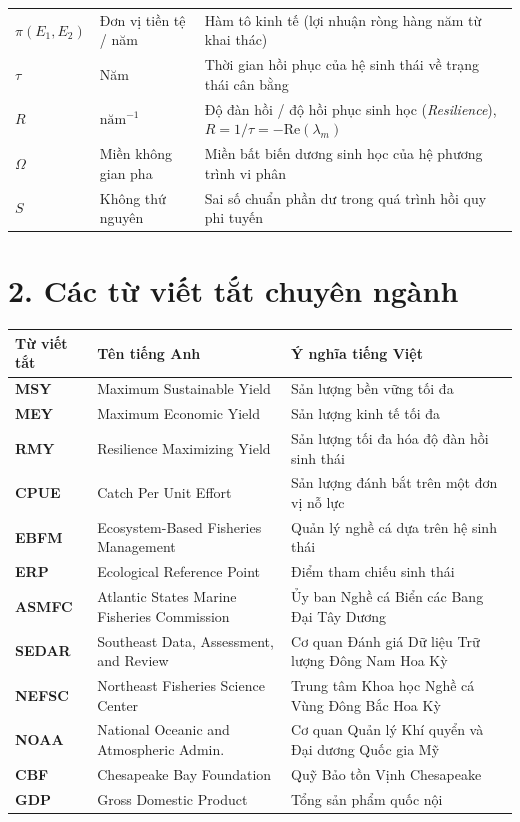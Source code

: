 \begin{table}[h!]
\begin{tabularx}{\textwidth}{l l X}
$\pi(E_1, E_2)$ & Đơn vị tiền tệ / năm & Hàm tô kinh tế (lợi nhuận ròng hàng năm từ khai thác) \\
$\tau$ & Năm & Thời gian hồi phục của hệ sinh thái về trạng thái cân bằng \\
$R$ & $\text{năm}^{-1}$ & Độ đàn hồi / độ hồi phục sinh học (\textit{Resilience}), $R = 1/\tau = -\mathrm{Re}(\lambda_m)$ \\
$\Omega$ & Miền không gian pha & Miền bất biến dương sinh học của hệ phương trình vi phân \\
$S$ & Không thứ nguyên & Sai số chuẩn phần dư trong quá trình hồi quy phi tuyến \\
\bottomrule
\end{tabularx}
\end{table}

\section*{2. Các từ viết tắt chuyên ngành}

\begin{table}[h!]
\centering
\begin{tabularx}{\textwidth}{l l X}
\toprule
\textbf{Từ viết tắt} & \textbf{Tên tiếng Anh} & \textbf{Ý nghĩa tiếng Việt} \\
\midrule
\textbf{MSY} & Maximum Sustainable Yield & Sản lượng bền vững tối đa \\
\textbf{MEY} & Maximum Economic Yield & Sản lượng kinh tế tối đa \\
\textbf{RMY} & Resilience Maximizing Yield & Sản lượng tối đa hóa độ đàn hồi sinh thái \\
\textbf{CPUE} & Catch Per Unit Effort & Sản lượng đánh bắt trên một đơn vị nỗ lực \\
\textbf{EBFM} & Ecosystem-Based Fisheries Management & Quản lý nghề cá dựa trên hệ sinh thái \\
\textbf{ERP} & Ecological Reference Point & Điểm tham chiếu sinh thái \\
\textbf{ASMFC} & Atlantic States Marine Fisheries Commission & Ủy ban Nghề cá Biển các Bang Đại Tây Dương \\
\textbf{SEDAR} & Southeast Data, Assessment, and Review & Cơ quan Đánh giá Dữ liệu Trữ lượng Đông Nam Hoa Kỳ \\
\textbf{NEFSC} & Northeast Fisheries Science Center & Trung tâm Khoa học Nghề cá Vùng Đông Bắc Hoa Kỳ \\
\textbf{NOAA} & National Oceanic and Atmospheric Admin. & Cơ quan Quản lý Khí quyển và Đại dương Quốc gia Mỹ \\
\textbf{CBF} & Chesapeake Bay Foundation & Quỹ Bảo tồn Vịnh Chesapeake \\
\textbf{GDP} & Gross Domestic Product & Tổng sản phẩm quốc nội \\
\bottomrule
\end{tabularx}
\end{table}
